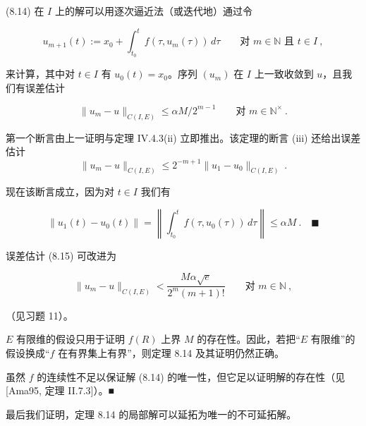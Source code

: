 \begin{remark}

\begin{items}
\item

(8.14) 在 $ I $ 上的解可以用逐次逼近法（或迭代地）通过令

\[
u_{m+1}(t):=x_{0}+\int_{t_{0}}^{t}f(\tau,u_{m}(\tau))\,d\tau\qquad\text{对 }m\in\mathbb{N}\text{ 且 }t\in I\ ,
\]

来计算，其中对 $ t\in I $ 有 $ u_{0}(t)=x_{0} $。序列 $ (u_{m}) $ 在 $ I $ 上一致收敛到 $ u $，且我们有误差估计

\begin{equation}
\|u_{m}-u\|_{C(I,E)}\le\alpha M/2^{m-1}\qquad\text{对 }m\in\mathbb{N}^{\times} \ .\tag{8.15}
\end{equation}

\begin{subitems}
\item

\proofhead
第一个断言由上一证明与定理 IV.4.3(ii) 立即推出。该定理的断言 (iii) 还给出误差估计
\[
\|u_{m}-u\|_{C(I,E)}\le 2^{-m+1}\|u_{1}-u_{0}\|_{C(I,E)} \ .
\]

现在该断言成立，因为对 $ t\in I $ 我们有

\[
\|u_{1}(t)-u_{0}(t)\|=\left\|\int_{t_{0}}^{t}f(\tau,u_{0}(\tau))\,d\tau\right\|\le\alpha M \ .\quad\blacksquare
\]
\end{subitems}

\item

误差估计 (8.15) 可改进为

\[
\|u_{m}-u\|_{C(I,E)}<\frac{M\alpha\sqrt{e}}{2^{m}(m+1)!}\qquad\text{对 }m\in\mathbb{N}\ ,
\]

（见习题 11）。

\item

$ E $ 有限维的假设只用于证明 $ f(R) $ 上界 $ M $ 的存在性。因此，若把“$ E $ 有限维”的假设换成“$ f $ 在有界集上有界”，则定理 8.14 及其证明仍然正确。

\item

虽然 $ f $ 的连续性不足以保证解 (8.14) 的唯一性，但它足以证明解的存在性（见 [Ama95, 定理 II.7.3]）。\nobreak\hspace{0.35em}■

\end{items}

最后我们证明，定理 8.14 的局部解可以延拓为唯一的不可延拓解。

\end{remark}

